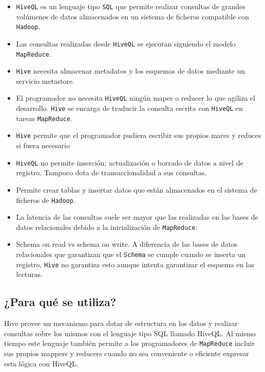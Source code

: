 \documentclass[]{article}
\begin{document}
\begin{itemize}
\itemsep1pt\parskip0pt
\item
  \texttt{HiveQL} es un lenguaje tipo \texttt{SQL} que permite realizar
  consultas de grandes volúmenes de datos almacenados en un sistema de
  ficheros compatible con \texttt{Hadoop}.
\item
  Las consultas realizadas desde \texttt{HiveQL} se ejecutan siguiendo
  el modelo \texttt{MapReduce}.
\item
  \texttt{Hive} necesita almacenar metadatos y los esquemas de datos
  mediante un servicio metastore.
\item
  El programador no necesita \texttt{HiveQL} ningún maper o reducer lo
  que agiliza el desarrollo. \texttt{Hive} se encarga de traducir la
  consulta escrita con \texttt{HiveQL} en tareas \texttt{MapReduce}.
\item
  \texttt{Hive} permite que el programador pudiera escribir sus propios
  mares y reduces si fuera necesario
\item
  \texttt{HiveQL} no permite inserción, actualización o borrado de datos
  a nivel de registro. Tampoco dota de transaccionalidad a sus
  consultas.
\item
  Permite crear tablas y insertar datos que están almacenados en el
  sistema de ficheros de \texttt{Hadoop}.
\item
  La latencia de las consultas suele ser mayor que las realizadas en las
  bases de datos relacionales debido a la inicialización de
  \texttt{MapReduce}.
\item
  Schema on read vs schema on write. A diferencia de las bases de datos
  relacionales que garantizan que el \texttt{Schema} se cumple cuando se
  inserta un registro, \texttt{Hive} no garantiza esto aunque intenta
  garantizar el esquema en las lecturas.
\end{itemize}

\subsection{¿Para qué se utiliza?}\label{para-que-se-utiliza-4}

Hive provee un mecanismo para dotar de estructura en los datos y
realizar consultas sobre los mismos con el lenguaje tipo SQL llamado
HiveQL. Al mismo tiempo este lenguaje también permite a los
programadores de \texttt{MapReduce} incluir sus propios mappers y
reducers cuando no sea conveniente o eficiente expresar esta lógica con
HiveQL.
\end{document}
